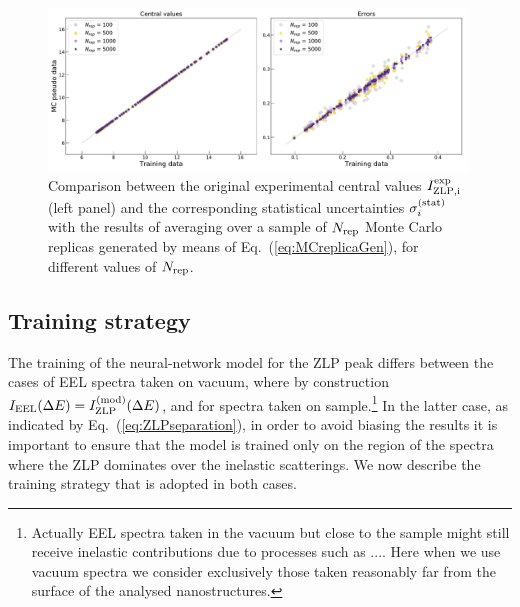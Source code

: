 \begin{figure}[t]
    \centering
    \includegraphics[width=0.99\textwidth]{plots/MC.pdf}
    \caption{Comparison between the original experimental central values
      $I_{\rm ZLP,i}^{\rm exp}$ (left panel) and the corresponding statistical
      uncertainties $\sigma_i^{(\rm stat)}$ with the results of averaging over
      a sample of $N_{\rm rep}$ Monte Carlo replicas generated by means of
      Eq.~(\ref{eq:MCreplicaGen}), for different values of
      $N_{\rm rep}$.
      }
    \label{fig:MC}
\end{figure}

\subsection{Training strategy}
\label{sec:training}

The training of the neural-network model for the ZLP peak differs between
the cases of EEL spectra taken on vacuum, where by construction $I_{\rm EEL}(\Delta E) =I_{\rm ZLP}^{\rm (mod)}(\Delta E)$,
and for spectra taken on sample.\footnote{Actually EEL spectra taken in the vacuum but close
  to the sample might still receive inelastic contributions due to processes such as .... Here
  when we use vacuum spectra we consider exclusively those taken reasonably far from the surface
of the analysed nanostructures.}
%
In the latter case, as indicated by Eq.~(\ref{eq:ZLPseparation}), in order to avoid
biasing the results it is
important to ensure that the model is trained only on the region of the spectra
where the ZLP dominates over the inelastic scatterings.
%
We now describe the training strategy that is adopted in both cases.

